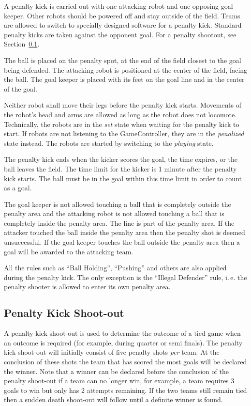 \documentclass[12pt]{article}
\newcommand{\ie}{\mbox{i.\,e.}\xspace}
\begin{document}
A penalty kick is carried out with one attacking robot and one opposing goal keeper. Other robots should be powered off and stay outside of the field. Teams are allowed to switch to specially designed software for a penalty kick. Standard penalty kicks are taken against the opponent goal. For a penalty shootout, see Section~\ref{sec:penalty_shoot-out}.

The ball is placed on the penalty spot, at the end of the field closest to the goal being defended. The attacking robot is positioned at the center of the field, facing the ball. The goal keeper is placed with its feet on the goal line and in the center of the goal.

Neither robot shall move their legs before the penalty kick starts. Movements of the robot's head and arms are allowed as long as the robot does not locomote. Technically, the robots are in the \emph{set} state when waiting for the penalty kick to start. If robots are not listening to the GameController, they are in the \emph{penalized} state instead. The robots are started by switching to the \emph{playing} state.

The penalty kick ends when the kicker scores the goal, the time expires, or the ball leaves the field. The time limit for the kicker is 1 minute after the penalty kick starts. The ball must be in the goal within this time limit in order to count as a goal.

The goal keeper is not allowed touching a ball that is completely outside the penalty area and the attacking robot is not allowed touching a ball that is completely inside the penalty area. The line is part of the penalty area. If the attacker touched the ball inside the penalty area then the penalty shot is deemed unsuccessful. If the goal keeper touches the ball outside the penalty area then a goal will be awarded to the attacking team.

All the rules such as ``Ball Holding'', ``Pushing'' and others are also applied during the penalty kick. The only exception is the ``Illegal Defender'' rule, \ie the penalty shooter is allowed to enter its own penalty area.

\subsection{Penalty Kick Shoot-out}
\label{sec:penalty_shoot-out}

A penalty kick shoot-out is used to determine the outcome of a tied game when an outcome is required (for example, during quarter or semi finals). The penalty kick shoot-out will initially consist of five penalty shots \emph{per} team. At the conclusion of these shots the team that has scored the most goals will be declared the winner. Note that a winner can be declared before the conclusion of the penalty shoot-out if a team can no longer win, for example, a team requires 3 goals to win but only has 2 attempts remaining. If the two teams still remain tied then a sudden death shoot-out will follow until a definite winner is found.
\end{document}
